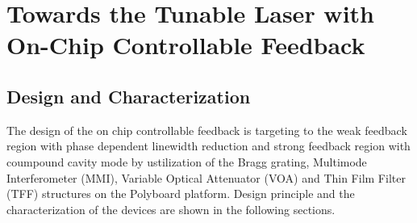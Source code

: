 \chapter{Towards the Tunable Laser with On-Chip Controllable Feedback}\label{ch:Towards_laser_with_on_chip_controllable_feedback}
\section{Design and Characterization}\label{sec:design_and_characterization}
The design of the on chip controllable feedback is targeting to the weak feedback region with phase dependent linewidth reduction and strong feedback region with coumpound cavity mode by ustilization of the Bragg grating, Multimode Interferometer (MMI), Variable Optical Attenuator (VOA) and Thin Film Filter (TFF) structures on the Polyboard platform. Design principle and the characterization of the devices are shown in the following sections.


